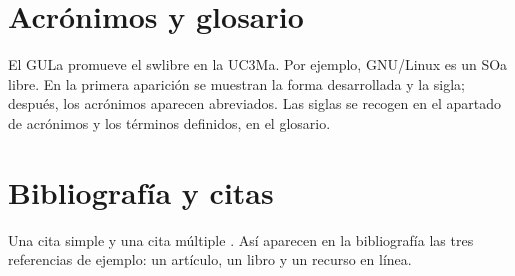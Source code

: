 \section{Acrónimos y glosario}

El \gls{GULa} promueve el \gls{swlibre} en la \gls{UC3Ma}. Por ejemplo,
GNU/Linux es un \gls{SOa} libre. En la primera
aparición se muestran la forma desarrollada y la sigla; después, los acrónimos
aparecen abreviados. Las siglas se recogen en el apartado de acrónimos y los
términos definidos, en el glosario.



\section{Bibliografía y citas}

Una cita simple \cite{prieto2014applications} y una cita múltiple
\cite{knuth1984texbook, uc3m_earchivo}. Así aparecen en la bibliografía las
tres referencias de ejemplo: un artículo, un libro y un recurso en línea.
